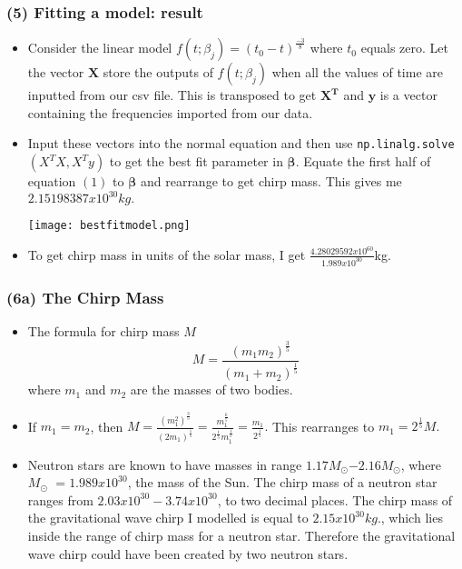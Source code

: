 \documentclass{beamer}
\renewcommand{\vec}[1]{\mathbf{#1}}
\def\code#1{\texttt{#1}}
\begin{document}
\begin{frame}
\frametitle{(5) Fitting a model: result}
\begin{itemize}
\item Consider the linear model $f(t;\beta_j) = (t_0-t)^\frac{-3}{8}$ where $t_0$ equals zero. Let the vector $\vec{X}$ store the outputs of $f(t;\beta_j)$ when all the values of time are inputted from our csv file. This is transposed to get $\vec{X^T}$ and $\vec{y}$ is a vector containing the frequencies imported from our data.
\item Input these vectors into the normal equation and then use \code{np.linalg.solve}$(X^TX, X^Ty)$ to get the best fit parameter in $\boldsymbol\beta.$ Equate the first half of equation $(1)$ to $\boldsymbol\beta$ and rearrange to get chirp mass. This gives me \boldmath$2.15198387 x 10^{30}kg.$
\centerline{\texttt{[image: bestfitmodel.png]}}
\item To get chirp mass in units of the solar mass, I get $\frac{4.28029592x10^{60}}{1.989 x 10^{30}}$kg.
\end{itemize}
\end{frame}
\begin{frame}
\frametitle{(6a) The Chirp Mass}
\begin{itemize} \item The formula for chirp mass $M$ $$M=\frac{(m_1m_2)^{\frac{3}{5}}}{(m_1+m_2)^{\frac{1}{5}}}$$ where $m_1$ and $m_2$ are the masses of two bodies.\footnotemark \item If $m_1 = m_2$, then $M = \frac{(m_1^2)^{\frac{3}{5}}}{(2m_1)^{\frac{1}{5}}} = \frac{m_1^{\frac{6}{5}}}{2^{\frac{1}{5}}m_1^{\frac{1}{5}}} = \frac{m_1}{2^{\frac{1}{5}}}.$ This rearranges to $m_1 = 2^{\frac{1}{5}}M.$
\item Neutron stars are known to have masses in range $1.17$\(M_\odot\)$- 2.16$\(M_\odot\), where \(M_\odot\) $ = 1.989 x10^{30}$, the mass of the Sun. The chirp mass of a neutron star ranges from $2.03 x10^{30} - 3.74 x10^{30}$, to two decimal places. The chirp mass of the gravitational wave chirp I modelled is equal to $2.15 x 10^{30}kg.$, which lies inside the range of chirp mass for a neutron star. Therefore the gravitational wave chirp could have been created by two neutron stars.

\end{itemize}
\end{frame}
\end{document}
